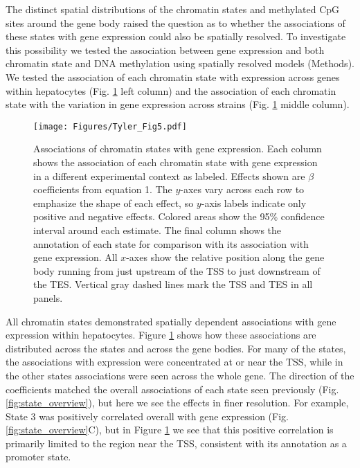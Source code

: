 \documentclass[
  11pt,
]{article}
\begin{document}
The distinct spatial distributions of the chromatin states and
methylated CpG sites around the gene body raised the question as to
whether the associations of these states with gene expression could also
be spatially resolved. To investigate this possibility we tested the
association between gene expression and both chromatin state and DNA
methylation using spatially resolved models (Methods). We tested the
association of each chromatin state with expression across genes within
hepatocytes (Fig. \ref{fig:state_effects} left column) and the
association of each chromatin state with the variation in gene
expression across strains (Fig. \ref{fig:state_effects} middle column).

\begin{figure}[ht!]
\texttt{[image: Figures/Tyler\_Fig5.pdf]}
\caption{Associations of chromatin states with gene expression. Each 
column shows the association of each chromatin state with gene 
expression in a different experimental context as labeled. 
Effects shown are $\beta$ coefficients from equation 1. The 
$y$-axes vary across each row to emphasize the shape of each effect, 
so $y$-axis labels indicate only positive and negative effects. 
Colored areas show the 95\% confidence interval around each 
estimate. The final column shows the annotation of each state for 
comparison with its association with gene expression. All $x$-axes 
show the relative position along the gene body running from just 
upstream of the TSS to just downstream of the TES. Vertical gray 
dashed lines mark the TSS and TES in all panels.
}
\label{fig:state_effects}
\end{figure}

All chromatin states demonstrated spatially dependent associations with
gene expression within hepatocytes. Figure \ref{fig:state_effects} shows
how these associations are distributed across the states and across the
gene bodies. For many of the states, the associations with expression
were concentrated at or near the TSS, while in the other states
associations were seen across the whole gene. The direction of the
coefficients matched the overall associations of each state seen
previously (Fig. \ref{fig:state_overview}), but here we see the effects
in finer resolution. For example, State 3 was positively correlated
overall with gene expression (Fig. \ref{fig:state_overview}C), but in
Figure \ref{fig:state_effects} we see that this positive correlation is
primarily limited to the region near the TSS, consistent with its
annotation as a promoter state.
\end{document}
